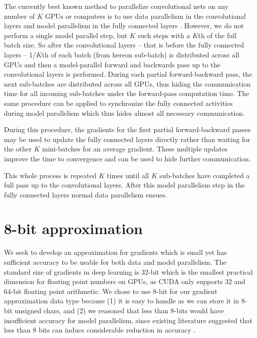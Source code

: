 \documentclass{article} %
\begin{document}
The currently best known method to parallelize convolutional nets on any number of $K$ GPUs or computers is to use data parallelism in the convolutional layers and model parallelism in the fully connected layers \citep{krizhevsky2014one}. However, we do not perform a single model parallel step, but $K$ such steps with a $K$th of the full batch size. So after the convolutional layers -- that is before the fully connected layers -- 1/$K$th of each batch (from hereon sub-batch) is distributed across all GPUs and then a model-parallel forward and backwards pass up to the convolutional layers is performed. During each partial forward-backward pass, the next sub-batches are distributed across all GPUs, thus hiding the communication time for all incoming sub-batches under the forward-pass computation time. The same procedure can be applied to synchronize the fully connected activities during model parallelism which thus hides almost all necessary communication. 

During this procedure, the gradients for the first partial forward-backward passes may be used to update the fully connected layers directly rather than waiting for the other $K$ mini-batches for an average gradient. These multiple updates improve the time to convergence and can be used to hide further communication.

This whole process is repeated $K$ times until all $K$ sub-batches have completed a full pass up to the convolutional layers. After this model parallelism step in the fully connected layers normal data parallelism ensues.

\section{8-bit approximation}

We seek to develop an approximation for gradients which is small yet has sufficient accuracy to be usable for both data and model parallelism. The standard size of gradients in deep learning is 32-bit which is the smallest practical dimension for floating point numbers on GPUs, as CUDA only supports 32 and 64-bit floating point arithmetic. We chose to use 8-bit for our gradient approximation data type because (1) it is easy to handle as we can store it in 8-bit unsigned chars, and (2) we reasoned that less than 8-bits would have insufficient accuracy for model parallelism, since existing literature suggested that less than 8 bits can induce considerable reduction in accuracy \citep{courbariaux2014low}. 
\end{document}
